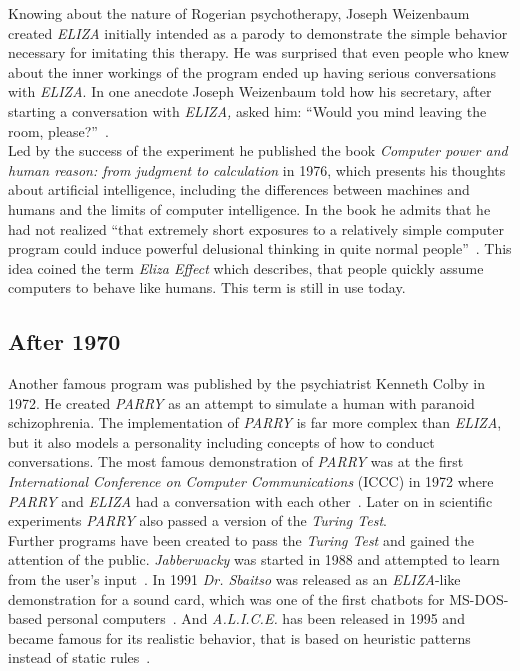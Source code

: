 Knowing about the nature of Rogerian psychotherapy, Joseph Weizenbaum created \emph{ELIZA} initially intended as a parody to demonstrate the simple behavior necessary for imitating this therapy.
He was surprised that even people who knew about the inner workings of the program ended up having serious conversations with \emph{ELIZA}.
In one anecdote Joseph Weizenbaum told how his secretary, after starting a conversation with \emph{ELIZA,} asked him: ``Would you mind leaving the room, please?''~\cite[5]{weizenbaum}.
\\

Led by the success of the experiment he published the book \emph{Computer power and human reason: from judgment to calculation} in 1976,
which presents his thoughts about artificial intelligence,
including the differences between machines and humans and the limits of computer intelligence.
In the book he admits that he had not realized ``that extremely short exposures to a relatively simple computer program could induce powerful delusional thinking in quite normal people''~\cite{bbcnowthen}.
This idea coined the term \emph{Eliza Effect} which describes, that people quickly assume computers to behave like humans.
This term is still in use today.


\subsection{After 1970}

Another famous program was published by the psychiatrist Kenneth Colby in 1972.
He created \emph{PARRY} as an attempt to simulate a human with paranoid schizophrenia.
The implementation of \emph{PARRY} is far more complex than \emph{ELIZA},
but it also models a personality including concepts of how to conduct conversations.
The most famous demonstration of \emph{PARRY} was at the first \emph{International Conference on Computer Communications} (ICCC) in 1972 where \emph{PARRY} and \emph{ELIZA} had a conversation with each other~\cite{internethistory}.
Later on in scientific experiments \emph{PARRY} also passed a version of the \emph{Turing Test}.
\\

Further programs have been created to pass the \emph{Turing Test} and gained the attention of the public.
\emph{Jabberwacky} was started in 1988 and attempted to learn from the user's input~\cite{jabberwacky}.
In 1991 \emph{Dr. Sbaitso} was released as an \emph{ELIZA}-like demonstration for a sound card, which was one of the first chatbots for MS-DOS-based personal computers~\cite{pcmag}.
And \emph{A.L.I.C.E.} has been released in 1995 and became famous for its realistic behavior, that is based on heuristic patterns instead of static rules~\cite{approximatinglife}.
\\

